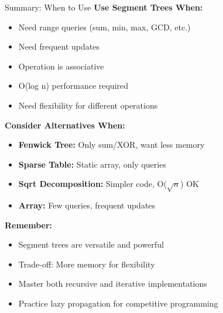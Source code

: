 \documentclass[aspectratio=169]{beamer}
\begin{document}
\begin{frame}{Summary: When to Use}
  \textbf{Use Segment Trees When:}
  \begin{itemize}
    \item Need range queries (sum, min, max, GCD, etc.)
    \item Need frequent updates
    \item Operation is associative
    \item O(log n) performance required
    \item Need flexibility for different operations
  \end{itemize}

  \vspace{0.5cm}
  \textbf{Consider Alternatives When:}
  \begin{itemize}
    \item \textbf{Fenwick Tree:} Only sum/XOR, want less memory
    \item \textbf{Sparse Table:} Static array, only queries
    \item \textbf{Sqrt Decomposition:} Simpler code, O($\sqrt{n}$) OK
    \item \textbf{Array:} Few queries, frequent updates
  \end{itemize}

  \vspace{0.5cm}
  \textbf{Remember:}
  \begin{itemize}
    \item Segment trees are versatile and powerful
    \item Trade-off: More memory for flexibility
    \item Master both recursive and iterative implementations
    \item Practice lazy propagation for competitive programming
  \end{itemize}
\end{frame}
\end{document}
